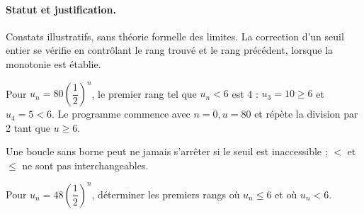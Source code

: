 \paragraph{Statut et justification.} Constats illustratifs, sans théorie formelle des limites. La correction d’un seuil entier se vérifie en contrôlant le rang trouvé et le rang précédent, lorsque la monotonie est établie.
\begin{example}Pour $u_n=80(\dfrac{1}{2})^n$, le premier rang tel que $u_n<6$ est 4 : $u_3=10\geq6$ et $u_4=5<6$. Le programme commence avec $n=0,u=80$ et répète la division par 2 tant que $u\geq6$.\end{example}\label{C01-EX5}
\begin{pitfall}Une boucle sans borne peut ne jamais s’arrêter si le seuil est inaccessible ; $<$ et $\leq$ ne sont pas interchangeables.\end{pitfall}
\begin{application}Pour $u_n=48(\dfrac{1}{2})^n$, déterminer les premiers rangs où $u_n\leq6$ et où $u_n<6$.\end{application}\label{C01-AP5}
\mxnewpage
